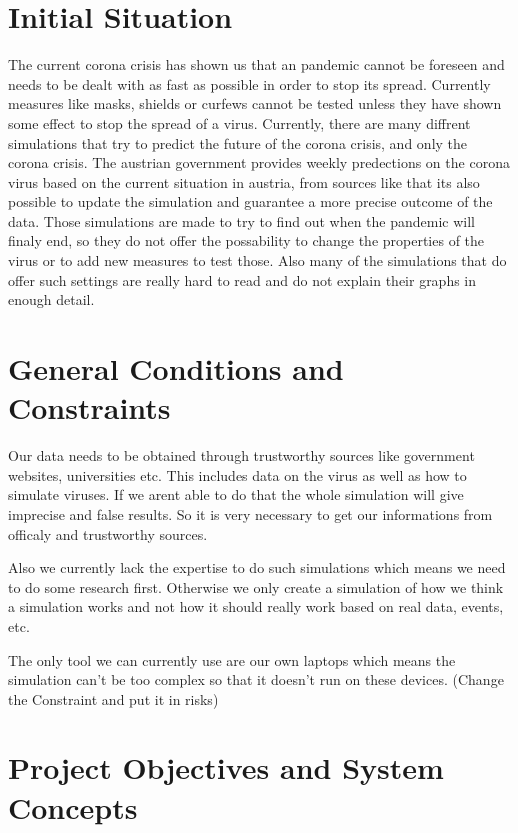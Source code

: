 \documentclass[12pt]{article}
\theoremstyle{definition}
\begin{document}
\pagebreak

\section{Initial Situation}

The current corona crisis has shown us that an pandemic cannot be foreseen and needs to be dealt with as fast as possible in order to stop its spread.
Currently measures like masks, shields or curfews cannot be tested unless they have shown some effect to stop the spread of a virus.
Currently, there are many diffrent simulations that try to predict the future of the corona crisis,
and only the corona crisis. The austrian government provides weekly predections on the corona virus based on the current situation in austria, from sources like that its also possible to update the simulation and guarantee a more precise outcome of the data.
Those simulations are made to try to find out when the pandemic will finaly end,
so they do not offer the possability to change the properties of the virus or to add new measures to test those.
Also many of the simulations that do offer such settings are really hard to read and do not explain their graphs in enough detail.

\pagebreak

\section{General Conditions and Constraints}

Our data needs to be obtained through trustworthy sources like government websites, universities etc.
This includes data on the virus as well as how to simulate viruses.
If we arent able to do that the whole simulation will give imprecise and false results.
So it is very necessary to get our informations from officaly and trustworthy sources. 

Also we currently lack the expertise to do such simulations which means we need to do some research first.
Otherwise we only create a simulation of how we think a simulation works and not how it should really work based on real data, events, etc.

The only tool we can currently use are our own laptops which means the simulation can't be too complex so that it doesn't run on these devices.
(Change the Constraint and put it in risks)

\pagebreak

\section{Project Objectives and System Concepts}
\end{document}
